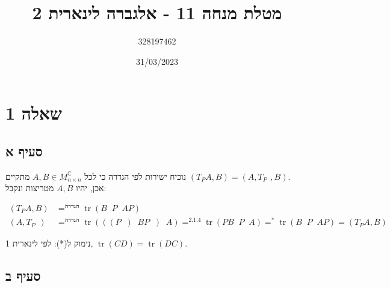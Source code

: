 \documentclass{article}
\title{מטלת מנחה 11 - אלגברה לינארית 2}
\author{328197462}
\date{31/03/2023}
\def\complex{\mathbb{C}}
\DeclareMathOperator*{\equals}{=}
\DeclareMathOperator{\trace}{tr}
\DeclareMathOperator{\adj}{^\ast}
\DeclareMathOperator{\inv}{^{-1}}
\begin{document}
\maketitle

\section*{שאלה 1}
\subsection*{סעיף א}

נוכיח ישירות לפי הגדרה כי לכל $A,B\in M^\complex_{n\times n}$ מתקיים $(T_P A, B)=(A, T_{P\adj}, B)$. \\
אכן, יהיו $A,B$ מטריצות ונקבל:

\begin{align*}
    (T_P A, B)     & \equals^\text{הגדרה}
    \trace (B \adj P\inv AP)              \\
    (A, T_{P\adj}) & \equals^\text{הגדרה}
    \trace (((P \adj) \inv B P \adj)\adj A) \equals^{2.1.4}
    \trace (P B \adj P \inv A) \equals^{\ast}
    \trace (B \adj P \inv A P) = (T_P A, B)
\end{align*}

נימוק ל(*): לפי לינארית 1, $\trace (CD) = \trace (DC)$.

\subsection*{סעיף ב}
\end{document}
